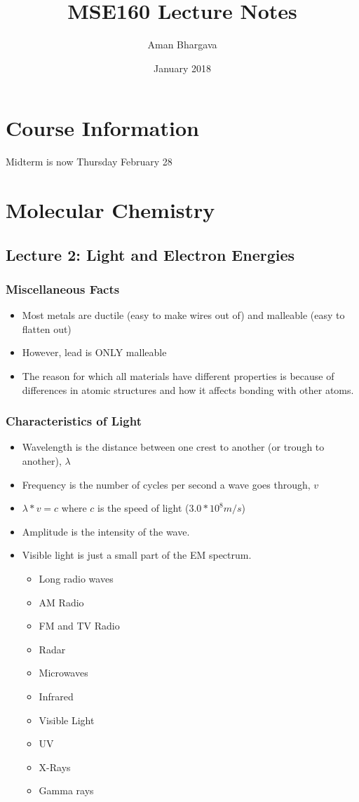 \documentclass[a4paper,12pt]{report}
\begin{document}
\title{MSE160 Lecture Notes}
\author{Aman Bhargava}
\date{January 2018}
\maketitle

\chapter{Course Information}

Midterm is now Thursday February 28

\chapter{Molecular Chemistry}
\section{Lecture 2: Light and Electron Energies}

\subsection{Miscellaneous Facts}
\begin{itemize}
\item Most metals are ductile (easy to make wires out of) and malleable (easy to flatten out)
\item However, lead is ONLY malleable
\item The reason for which all materials have different properties is because of differences in atomic structures and how it affects bonding with other atoms.
\end{itemize}

\subsection{Characteristics of Light}
\begin{itemize}
\item Wavelength is the distance between one crest to another (or trough to another), $\lambda$
\item Frequency is the number of cycles per second a wave goes through, $v$
\item $\lambda * v = c$ where $c$ is the speed of light ($3.0*10^8  m/s$)
\item Amplitude is the intensity of the wave.
\item Visible light is just a small part of the EM spectrum.
\begin{itemize}
\item Long radio waves
\item AM Radio
\item FM and TV Radio
\item Radar
\item Microwaves
\item Infrared
\item Visible Light
\item UV
\item X-Rays
\item Gamma rays
\end{itemize}
\end{itemize}
\end{document}
